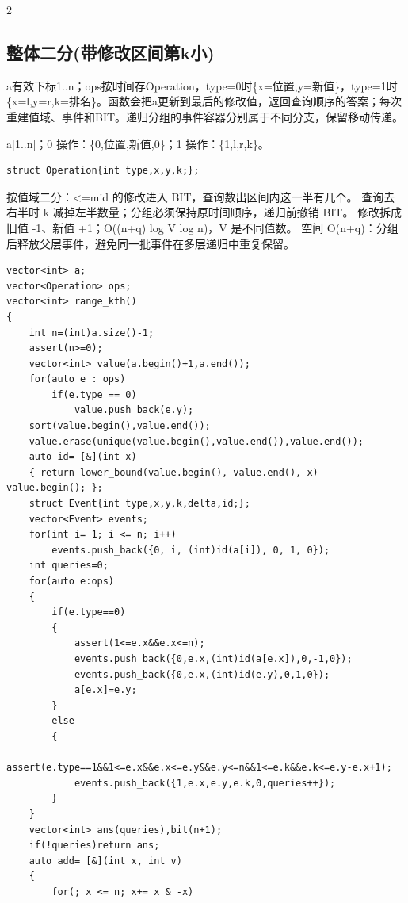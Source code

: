 \documentclass[UTF8,fontset=fandol,a4paper,twoside]{ctexart}
\newcommand{\note}[1]{{\fontsize{10}{12}\selectfont #1\par}}
\begin{document}
\begin{multicols}{2}
\subsection{整体二分(带修改区间第k小)}

\note{a有效下标1.\allowbreak{}.\allowbreak{}n；ops按时间存Operation，type=\allowbreak{}0时\{x=\allowbreak{}位置,\allowbreak{}y=\allowbreak{}新值\}，type=\allowbreak{}1时\{x=\allowbreak{}l,\allowbreak{}y=\allowbreak{}r,\allowbreak{}k=\allowbreak{}排名\}。函数会把a更新到最后的修改值，返回查询顺序的答案；每次重建值域、事件和BIT。递归分组的事件容器分别属于不同分支，保留移动传递。}
\note{a[\allowbreak{}1.\allowbreak{}.\allowbreak{}n]\allowbreak{}；0 操作：\{0,\allowbreak{}位置,\allowbreak{}新值,\allowbreak{}0\}；1 操作：\{1,\allowbreak{}l,\allowbreak{}r,\allowbreak{}k\}。}
\begin{lstlisting}
struct Operation{int type,x,y,k;};
\end{lstlisting}
\note{按值域二分：<\allowbreak{}=\allowbreak{}mid 的修改进入 BIT，查询数出区间内这一半有几个。 查询去右半时 k 减掉左半数量；分组必须保持原时间顺序，递归前撤销 BIT。 修改拆成旧值 -\allowbreak{}1、新值 +\allowbreak{}1；O(\allowbreak{}(\allowbreak{}n+\allowbreak{}q)\allowbreak{} log V log n)\allowbreak{}，V 是不同值数。 空间 O(\allowbreak{}n+\allowbreak{}q)\allowbreak{}：分组后释放父层事件，避免同一批事件在多层递归中重复保留。}
\begin{lstlisting}
vector<int> a;
vector<Operation> ops;
vector<int> range_kth()
{
    int n=(int)a.size()-1;
    assert(n>=0);
    vector<int> value(a.begin()+1,a.end());
    for(auto e : ops)
        if(e.type == 0)
            value.push_back(e.y);
    sort(value.begin(),value.end());
    value.erase(unique(value.begin(),value.end()),value.end());
    auto id= [&](int x)
    { return lower_bound(value.begin(), value.end(), x) - value.begin(); };
    struct Event{int type,x,y,k,delta,id;};
    vector<Event> events;
    for(int i= 1; i <= n; i++)
        events.push_back({0, i, (int)id(a[i]), 0, 1, 0});
    int queries=0;
    for(auto e:ops)
    {
        if(e.type==0)
        {
            assert(1<=e.x&&e.x<=n);
            events.push_back({0,e.x,(int)id(a[e.x]),0,-1,0});
            events.push_back({0,e.x,(int)id(e.y),0,1,0});
            a[e.x]=e.y;
        }
        else
        {
            assert(e.type==1&&1<=e.x&&e.x<=e.y&&e.y<=n&&1<=e.k&&e.k<=e.y-e.x+1);
            events.push_back({1,e.x,e.y,e.k,0,queries++});
        }
    }
    vector<int> ans(queries),bit(n+1);
    if(!queries)return ans;
    auto add= [&](int x, int v)
    {
        for(; x <= n; x+= x & -x)

\end{lstlisting}
\end{multicols}
\end{document}
